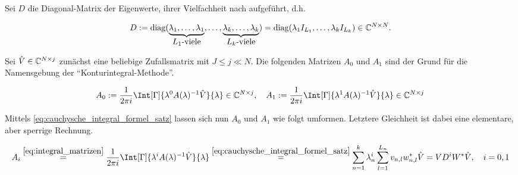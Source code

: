 Sei $D$ die Diagonal-Matrix der Eigenwerte, ihrer Vielfachheit nach aufgeführt, d.h.

\begin{align} \label{eq:diagonal_matrix}
    D
    :=
    \operatorname{diag}
    (
        \underbrace
        {
            \lambda_1, \dots, \lambda_1
        }_{
            \displaystyle
            \text{$L_1$-viele}
        },
        \dots,
        \underbrace
        {
            \lambda_k, \dots, \lambda_k
        }_{
            \displaystyle
            \text{$L_k$-viele}
        }
    )
    =
    \operatorname{diag}(\lambda_1 I_{L_1}, \dots, \lambda_k I_{L_k})
    \in
    \mathbb C^{N \times N}.
\end{align}

Sei $\hat V \in \mathbb C^{N \times j}$ zunächst eine beliebige Zufallsmatrix mit $J \leq j \ll N$.
Die folgenden Matrizen $A_0$ und $A_1$ sind der Grund für die Namensgebung der \enquote{Konturintegral-Methode}.

\begin{align} \label{eq:integral_matrizen}
    A_0 := \frac{1}{2 \pi i} \Int[\Gamma]{\lambda^0 A(\lambda)^{-1} \hat V}{\lambda} \in \C^{N \times j},
    \quad
    A_1 := \frac{1}{2 \pi i} \Int[\Gamma]{\lambda^1 A(\lambda)^{-1} \hat V}{\lambda} \in \C^{N \times j}
\end{align}

Mittels \eqref{eq:cauchysche_integral_formel_satz} lassen sich nun $A_0$ und $A_1$ wie folgt umformen.
Letztere Gleichheit ist dabei eine elementare, aber sperrige Rechnung.

\begin{align} \label{eq:integral_matrizen_resultat_compact}
    A_i
    \stackrel
    {
        \eqref{eq:integral_matrizen}
    }{=}
    \frac{1}{2 \pi i}
    \Int[\Gamma]
    {
        \lambda^i
        A(\lambda)^{-1}
        \hat V
    }{\lambda}
    \stackrel
    {
        \eqref{eq:cauchysche_integral_formel_satz}
    }{=}
    \sum_{n=1}^k
        \lambda_n^i
        \sum_{l=1}^{L_n}
            v_{n, l} w_{n, l}^\ast
    \hat V
    =
    V D^i W^\ast \hat V,
    \quad
    i = 0, 1
\end{align}
